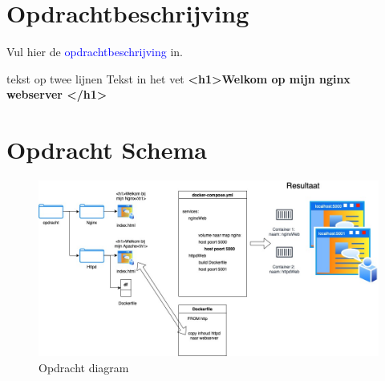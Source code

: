 
\section{Opdrachtbeschrijving}
\label{sec:opdrb}

Vul hier de \textcolor{blue}{opdrachtbeschrijving} in. 

tekst op \newline
twee lijnen \newline
Tekst in het vet \textbf{<h1>Welkom op mijn nginx webserver </h1>}\newline








\section{Opdracht Schema}
\label{sec:opdr-schema}

\begin{figure}[H]
  \centering
  \includegraphics[width=1.3\textwidth, angle=90]{./lists/images/diagram.jpg}
  \caption{Opdracht diagram}
  \label{figure:opdr-diagram}
\end{figure}

